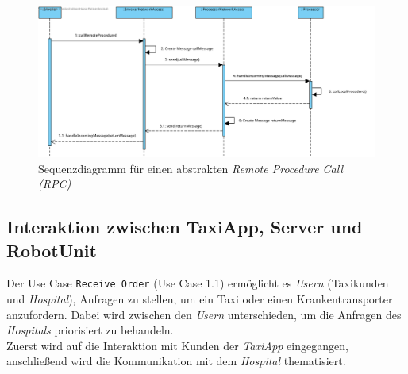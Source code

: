 \begin{figure}[H]
	\centering
	\includegraphics[height=0.6\textwidth, angle=90]{img/2-Entwurf-Communication_RPC}
	\caption{Sequenzdiagramm für einen abstrakten \emph{Remote Procedure Call (RPC)}}
	\label{SequenzDiagrammRPC}
\end{figure}

\subsection*{Interaktion zwischen TaxiApp, Server und RobotUnit}

Der Use Case \texttt{Receive Order} (Use Case 1.1) ermöglicht es \emph{Usern} (Taxikunden und \emph{Hospital}), Anfragen zu stellen, um ein Taxi oder einen Krankentransporter anzufordern. Dabei wird zwischen den \emph{Usern} unterschieden, um die Anfragen des \emph{Hospitals} priorisiert zu behandeln.\\
Zuerst wird auf die Interaktion mit Kunden der \emph{TaxiApp} eingegangen, anschließend wird die Kommunikation mit dem \emph{Hospital} thematisiert. \\ \\

